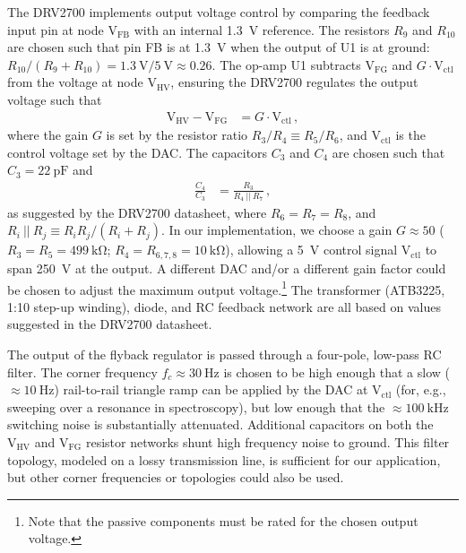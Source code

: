 \documentclass[aip,rsi,reprint]{revtex4-1} %
\begin{document}
The DRV2700 implements output voltage control by comparing the feedback input pin at node $\text{V}_\text{FB}$ with an internal \SI{1.3}{\volt} reference.
The resistors $R_9$ and $R_{10}$ are chosen such that pin FB is at \SI{1.3}{\volt} when the output of U1 is at ground: $R_{10}/(R_9+R_{10}) = \SI{1.3}{\volt}/\SI{5}{\volt} \approx \num{0.26}$.
The op-amp U1 subtracts $\text{V}_\text{FG}$ and $G\cdot \text{V}_\text{ctl}$ from the voltage at node $\text{V}_\text{HV}$, ensuring the DRV2700 regulates the output voltage such that
\begin{align}
\label{Eq:U1Output}
\text{V}_\text{HV} - \text{V}_{\text{FG}} &= G\cdot \text{V}_{\text{ctl}}\,,
\end{align}
where the gain $G$ is set by the resistor ratio $R_3/R_4 \equiv R_5/R_6$, and $\text{V}_\text{ctl}$ is the control voltage set by the DAC.
The capacitors $C_3$ and $C_4$ are chosen such that $C_3 = \SI{22}{\pico\farad}$ and
\begin{align}
\frac{C_4}{C_3} &= \frac{R_3}{R_4~||~R_7}\,,
\end{align}
as suggested by the DRV2700 datasheet\cite{DRV2700Datasheet}, where $R_6 = R_7 = R_8$, and $R_i~||~R_j \equiv R_i R_j/(R_i + R_j)$.
In our implementation, we choose a gain $G\approx 50$ ($R_3 = R_5 = \SI{499}{\kilo\ohm}$; $R_4 = R_{6,7,8} = \SI{10}{\kilo\ohm}$), allowing a \SI{5}{\volt} control signal $\text{V}_\text{ctl}$ to span \SI{250}{\volt} at the output. 
A different DAC and/or a different gain factor could be chosen to adjust the maximum output voltage.\footnote{Note that the passive components must be rated for the chosen output voltage.}
The transformer (ATB3225, 1:10 step-up winding), diode, and RC feedback network are all based on values suggested in the DRV2700 datasheet.\cite{DRV2700Datasheet,DRV2700EVMUserGuide}

The output of the flyback regulator is passed through a four-pole, low-pass RC filter.
The corner frequency $f_c \approx \SI{30}{\hertz}$ is chosen to be high enough that a slow ($\approx \SI{10}{\hertz}$) rail-to-rail triangle ramp can be applied by the DAC at $\text{V}_\text{ctl}$ (for, e.g., sweeping over a resonance in spectroscopy), but low enough that the $\approx \SI{100}{\kilo\hertz}$ switching noise is substantially attenuated.
Additional capacitors on both the $\text{V}_\text{HV}$ and $\text{V}_\text{FG}$ resistor networks shunt high frequency noise to ground.
This filter topology, modeled on a lossy transmission line, is sufficient for our application, but other corner frequencies or topologies could also be used.
\end{document}
